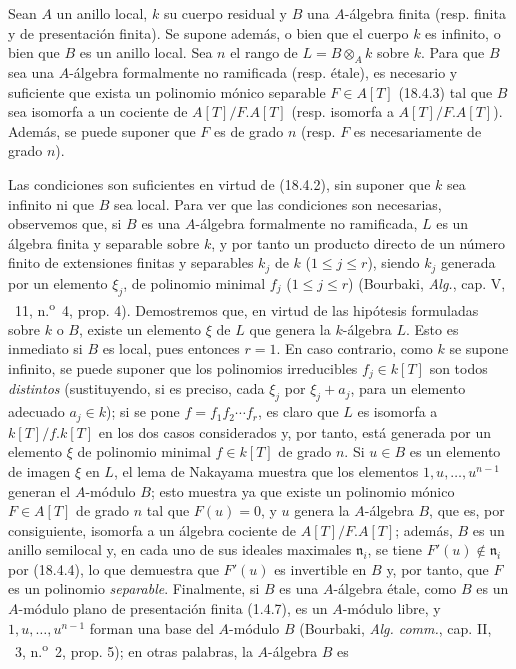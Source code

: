\begin{proposition}[18.4.5]
\label{IV.18.4.5}
Sean $A$ un anillo local, $k$ su cuerpo residual y $B$ una $A$-álgebra finita \textup{(resp.} finita y de presentación finita\textup{)}. Se supone además, o bien que el cuerpo $k$ es infinito, o bien que $B$ es un anillo local. Sea $n$ el rango de $L=B\otimes_A k$ sobre $k$. Para que $B$ sea una $A$-álgebra formalmente no ramificada \textup{(resp.} étale\textup{)}, es necesario y suficiente que exista un polinomio mónico separable $F\in A[T]$ \textup{(18.4.3)} tal que $B$ sea isomorfa a un cociente de $A[T]/F.A[T]$ \textup{(resp.} isomorfa a $A[T]/F.A[T]$\textup{)}. Además, se puede suponer que $F$ es de grado $n$ \textup{(resp.} $F$ es necesariamente de grado $n$\textup{)}.
\end{proposition}

Las condiciones son suficientes en virtud de (18.4.2), sin suponer que $k$ sea infinito ni que $B$ sea local. Para ver que las condiciones son necesarias, observemos que, si $B$ es una $A$-álgebra formalmente no ramificada, $L$ es un álgebra finita y separable sobre $k$, y por tanto un producto directo de un número finito de extensiones finitas y separables $k_j$ de $k$ ($1\leq j\leq r$), siendo $k_j$ generada por un elemento $\xi_j$, de polinomio minimal $f_j$ ($1\leq j\leq r$) (Bourbaki, \emph{Alg.}, cap. V, \textsection~11, n.\textsuperscript{o}~4, prop. 4). Demostremos que, en virtud de las hipótesis formuladas sobre $k$ o $B$, existe un elemento $\xi$ de $L$ que genera la $k$-álgebra $L$. Esto es inmediato si $B$ es local, pues entonces $r=1$. En caso contrario, como $k$ se supone infinito, se puede suponer que los polinomios irreducibles $f_j\in k[T]$ son todos \emph{distintos} (sustituyendo, si es preciso, cada $\xi_j$ por $\xi_j+a_j$, para un elemento adecuado $a_j\in k$); si se pone $f=f_1f_2\cdots f_r$, es claro que $L$ es isomorfa a $k[T]/f.k[T]$ en los dos casos considerados y, por tanto, está generada por un elemento $\xi$ de polinomio minimal $f\in k[T]$ de grado $n$. Si $u\in B$ es un elemento de imagen $\xi$ en $L$, el lema de Nakayama muestra que los elementos $1,u,\ldots,u^{n-1}$ generan el $A$-módulo $B$; esto muestra ya que existe un polinomio mónico $F\in A[T]$ de grado $n$ tal que $F(u)=0$, y $u$ genera la $A$-álgebra $B$, que es, por consiguiente, isomorfa a un álgebra cociente de $A[T]/F.A[T]$; además, $B$ es un anillo semilocal y, en cada uno de sus ideales maximales $\mathfrak n_i$, se tiene $F'(u)\notin\mathfrak n_i$ por (18.4.4), lo que demuestra que $F'(u)$ es invertible en $B$ y, por tanto, que $F$ es un polinomio \emph{separable}. Finalmente, si $B$ es una $A$-álgebra étale, como $B$ es un $A$-módulo plano de presentación finita (1.4.7), es un $A$-módulo libre, y $1,u,\ldots,u^{n-1}$ forman una base del $A$-módulo $B$ (Bourbaki, \emph{Alg. comm.}, cap. II, \textsection~3, n.\textsuperscript{o}~2, prop. 5); en otras palabras, la $A$-álgebra $B$ es

